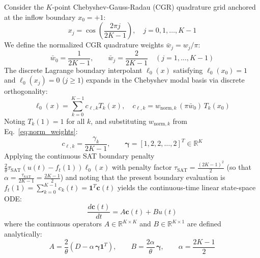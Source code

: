 \documentclass[10pt,twocolumn,a4paper]{article}
\theoremstyle{plain}
\theoremstyle{definition}
\begin{document}
Consider the $K$-point Chebyshev-Gauss-Radau (CGR) quadrature grid anchored at the inflow boundary $x_0 = +1$:
\begin{equation}
x_j = \cos\!\left(\frac{2\pi j}{2K - 1}\right), \quad j = 0, 1, \dots, K-1
\label{eq:cgr_nodes}
\end{equation}
We define the normalized CGR quadrature weights $\bar{w}_j = w_j / \pi$:
\begin{equation}
\bar{w}_0 = \frac{1}{2K - 1}, \qquad \bar{w}_j = \frac{2}{2K - 1} \quad (j = 1, \dots, K-1)
\label{eq:cgr_weights}
\end{equation}
The discrete Lagrange boundary interpolant $\ell_0(x)$ satisfying $\ell_0(x_0) = 1$ and $\ell_0(x_j) = 0$ ($j \ge 1$) expands in the Chebyshev modal basis via discrete orthogonality:
\begin{equation}
\ell_0(x) = \sum_{k=0}^{K-1} c_{\ell, k} T_k(x), \quad c_{\ell, k} = w_{\mathrm{norm}, k} \, (\pi \bar{w}_0) \, T_k(x_0)
\end{equation}
Noting $T_k(1) = 1$ for all $k$, and substituting $w_{\mathrm{norm}, k}$ from Eq.~\eqref{eq:norm_weights}:
\begin{equation}
c_{\ell, k} = \frac{\gamma_k}{2K - 1}, \qquad \boldsymbol{\gamma} = [1, 2, 2, \dots, 2]^T \in \mathbb{R}^K
\label{eq:gamma_vector}
\end{equation}
Applying the continuous SAT boundary penalty $\frac{2}{\theta} \tau_{\mathrm{SAT}} (u(t) - f_t(1)) \ell_0(x)$ with penalty factor $\tau_{\mathrm{SAT}} = \frac{(2K - 1)^2}{2}$ (so that $\alpha = \frac{\tau_{\mathrm{SAT}}}{2K - 1} = \frac{2K - 1}{2}$) and noting that the present boundary evaluation is $f_t(1) = \sum_{k=0}^{K-1} c_k(t) = \mathbf{1}^T \mathbf{c}(t)$ yields the continuous-time linear state-space ODE:
\begin{equation}
\frac{d\mathbf{c}(t)}{dt} = A \mathbf{c}(t) + B u(t)
\label{eq:cgr_ode}
\end{equation}
where the continuous operators $A \in \mathbb{R}^{K \times K}$ and $B \in \mathbb{R}^{K \times 1}$ are defined analytically:
\begin{equation}
A = \frac{2}{\theta} \left( D - \alpha \, \boldsymbol{\gamma} \mathbf{1}^T \right), \qquad B = \frac{2\alpha}{\theta} \, \boldsymbol{\gamma}, \qquad \alpha = \frac{2K - 1}{2}
\label{eq:canonical_AB}
\end{equation}
\end{document}
